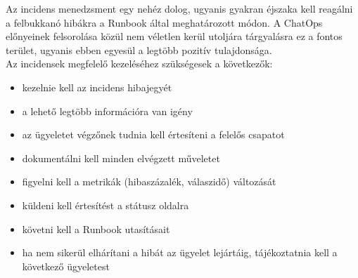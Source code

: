 Az incidens menedzsment egy nehéz dolog, ugyanis gyakran éjszaka kell reagálni a felbukkanó hibákra a Runbook által meghatározott módon. A ChatOps előnyeinek felsorolása közül nem véletlen kerül utoljára tárgyalásra ez a fontos terület, ugyanis ebben egyesül a legtöbb pozitív tulajdonsága.\\
Az incidensek megfelelő kezeléséhez szükségesek a következők:
\begin{itemize}
  \item kezelnie kell az incidens hibajegyét
  \item a lehető legtöbb információra van igény
  \item az ügyeletet végzőnek tudnia kell értesíteni a felelős csapatot
  \item dokumentálni kell minden elvégzett műveletet
  \item figyelni kell a metrikák (hibaszázalék, válaszidő) változását
  \item küldeni kell értesítést a státusz oldalra
  \item követni kell a Runbook utasításait
  \item ha nem sikerül elhárítani a hibát az ügyelet lejártáig, tájékoztatnia kell a következő ügyeletest
\end{itemize}

